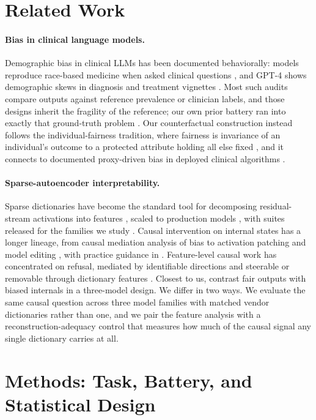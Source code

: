 \documentclass[11pt]{article}
\begin{document}
\section{Related Work}
\paragraph{Bias in clinical language models.} Demographic bias in clinical LLMs has been documented behaviorally: models reproduce race-based medicine when asked clinical questions \citep{omiye2023}, and GPT-4 shows demographic skews in diagnosis and treatment vignettes \citep{zack2024}. Most such audits compare outputs against reference prevalence or clinician labels, and those designs inherit the fragility of the reference; our own prior battery ran into exactly that ground-truth problem \citep{psychbench}. Our counterfactual construction instead follows the individual-fairness tradition, where fairness is invariance of an individual's outcome to a protected attribute holding all else fixed \citep{dwork2012,kusner2017,barocas2023}, and it connects to documented proxy-driven bias in deployed clinical algorithms \citep{obermeyer2019}.

\paragraph{Sparse-autoencoder interpretability.} Sparse dictionaries have become the standard tool for decomposing residual-stream activations into features \citep{bricken2023,cunningham2024}, scaled to production models \citep{templeton2024}, with suites released for the families we study \citep{gemmascope,gemmascope2,llamascope,qwenscope}. Causal intervention on internal states has a longer lineage, from causal mediation analysis of bias \citep{vig2020} to activation patching and model editing \citep{meng2022}, with practice guidance in \citet{zhang2024}. Feature-level causal work has concentrated on refusal, mediated by identifiable directions \citep{arditi2024} and steerable or removable through dictionary features \citep{obrien2024,beyond2026}. Closest to us, \citet{tripathy2026} contrast fair outputs with biased internals in a three-model design. We differ in two ways. We evaluate the same causal question across three model families with matched vendor dictionaries rather than one, and we pair the feature analysis with a reconstruction-adequacy control that measures how much of the causal signal any single dictionary carries at all.

\section{Methods: Task, Battery, and Statistical Design}
\end{document}
